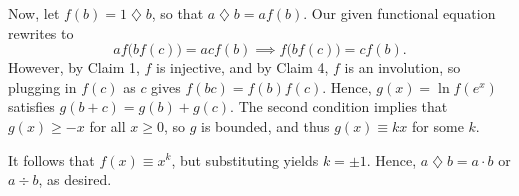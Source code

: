 Now, let $f(b)=1\mathbin{\diamondsuit}b$, so that $a\mathbin{\diamondsuit}b=af(b)$. Our given functional equation rewrites to \[af\big(bf(c)\big)=acf(b)\implies f\big(bf(c)\big)=cf(b).\]
However, by Claim 1, $f$ is injective, and by Claim 4, $f$ is an involution, so plugging in $f(c)$ as $c$ gives $f(bc)=f(b)f(c)$. Hence, $g(x)=\ln f(e^x)$ satisfies $g(b+c)=g(b)+g(c)$. The second condition implies that $g(x)\ge -x$ for all $x\ge 0$, so $g$ is bounded, and thus $g(x)\equiv kx$ for some $k$.

It follows that $f(x)\equiv x^k$, but substituting yields $k=\pm 1$. Hence, $a\mathbin{\diamondsuit}b=a\cdot b$ or $a\div b$, as desired.
